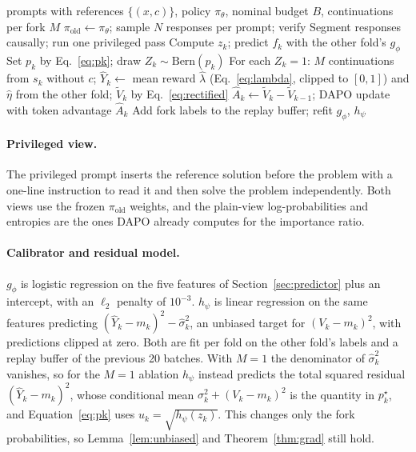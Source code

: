 \documentclass[11pt]{article}
\newcommand{\method}{ForkOPD}
\newcommand{\Vt}{\tilde V}
\newcommand{\Ah}{\hat A}
\newcommand{\Yh}{\hat Y}
\newcommand{\piold}{\pi_{\mathrm{old}}}
\theoremstyle{remark}
\begin{document}
\begin{algorithm}[t]
\caption{One iteration of \method{}}
\label{alg:precise}
\small
\begin{algorithmic}[1]
\Require prompts with references $\{(x,c)\}$, policy $\pi_\theta$, nominal budget $B$, continuations per fork $M$
\State $\piold\gets\pi_\theta$; sample $N$ responses per prompt; verify
\State Segment responses causally; run one privileged pass
\State Compute $z_k$; predict $f_k$ with the other fold's $g_\phi$
\State Set $p_k$ by Eq.~\eqref{eq:pk}; draw $Z_k\sim\mathrm{Bern}(p_k)$
\State For each $Z_k=1$: $M$ continuations from $s_k$ without $c$; $\Yh_k\gets$ mean reward
\State $\hat\lambda$ (Eq.~\ref{eq:lambda}, clipped to $[0,1]$) and $\hat\eta$ from the other fold; $\Vt_k$ by Eq.~\eqref{eq:rectified}
\State $\Ah_k\gets\Vt_k-\Vt_{k-1}$; DAPO update with token advantage $\Ah_k$
\State Add fork labels to the replay buffer; refit $g_\phi$, $h_\psi$
\end{algorithmic}
\end{algorithm}

\paragraph{Privileged view.}
The privileged prompt inserts the reference solution before the problem with a one-line instruction to read it and then solve the problem independently. Both views use the frozen $\piold$ weights, and the plain-view log-probabilities and entropies are the ones DAPO already computes for the importance ratio.

\paragraph{Calibrator and residual model.}
$g_\phi$ is logistic regression on the five features of Section~\ref{sec:predictor} plus an intercept, with an $\ell_2$ penalty of $10^{-3}$. $h_\psi$ is linear regression on the same features predicting $(\Yh_k-m_k)^2-\hat\sigma_k^2$, an unbiased target for $(V_k-m_k)^2$, with predictions clipped at zero. Both are fit per fold on the other fold's labels and a replay buffer of the previous 20 batches. With $M=1$ the denominator of $\hat\sigma_k^2$ vanishes, so for the $M=1$ ablation $h_\psi$ instead predicts the total squared residual $(\Yh_k-m_k)^2$, whose conditional mean $\sigma_k^2+(V_k-m_k)^2$ is the quantity in $p_k^\star$, and Equation~\eqref{eq:pk} uses $u_k=\sqrt{h_\psi(z_k)}$. This changes only the fork probabilities, so Lemma~\ref{lem:unbiased} and Theorem~\ref{thm:grad} still hold.
\end{document}
